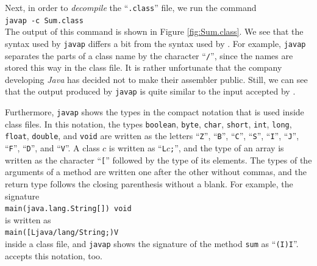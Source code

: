 Next, in order to \emph{decompile} the ``\texttt{.class}'' file, we run the command
\\[0.2cm]
\hspace*{1.3cm}
\texttt{javap -c Sum.class}
\\[0.2cm]
The output of this command is shown in Figure \ref{fig:Sum.class}.  We see that the syntax used by
\texttt{javap} differs a bit from the syntax used by .  For example, \texttt{javap} separates the
parts of a class name by the character ``\texttt{/}'', since the names are stored this way in the class file.
It is rather unfortunate that
the company developing \textsl{Java} has decided not to make their assembler public.  Still, we can
see that the output produced by \texttt{javap} is quite similar to the input accepted by .

Furthermore, \texttt{javap} shows the types in the compact notation that is used inside class
files.\label{jvm-descriptors}  In this notation, the types \texttt{boolean}, \texttt{byte}, \texttt{char},
\texttt{short}, \texttt{int}, \texttt{long}, \texttt{float}, \texttt{double}, and \texttt{void} are written as the
letters ``\texttt{Z}'', ``\texttt{B}'', ``\texttt{C}'', ``\texttt{S}'', ``\texttt{I}'', ``\texttt{J}'', ``\texttt{F}'',
``\texttt{D}'', and ``\texttt{V}''.  A class $c$ is written as ``\texttt{L}$c$\texttt{;}'', and the type of an
array is written as the character ``\texttt{[}'' followed by the type of its elements.  The types of the
arguments of a method are written one after the other without commas, and the return type follows the closing
parenthesis without a blank.  For example, the signature
\\[0.2cm]
\hspace*{1.3cm}
\texttt{main(java.lang.String[]) void}
\\[0.2cm]
is written as
\\[0.2cm]
\hspace*{1.3cm}
\texttt{main([Ljava/lang/String;)V}
\\[0.2cm]
inside a class file, and \texttt{javap} shows the signature of the method \texttt{sum} as ``\texttt{(I)I}''.
 accepts this notation, too.

